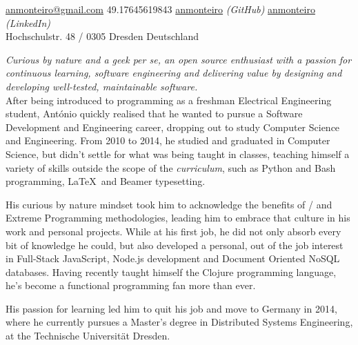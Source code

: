 \documentclass[10pt,a4paper]{article}
\begin{document}
\sloppy  %



\nobreakvspace{0.3em}  %

\noindent\href{mailto:anmonteiro.at.gmail.dot.com}{anmonteiro\mbox{}@\mbox{}gmail.com}\sbull
\textsmaller{+}49.17645619843\sbull
{\newnums \href{http://www.github.com/anmonteiro}{anmonteiro}} \emph{(GitHub)}\sbull
\href{http://www.linkedin.com/in/anmonteiro}{anmonteiro} \emph{(LinkedIn)}
\\
Hochschulstr. 48 / 0305 Dresden\sbull
Deutschland

\spacedhrule{0.9em}{-0.4em}  %


\vspace{-1.3em}  %
\begin{multicols}{2}  %
\emph{Curious by nature and a geek \emph{per se}, an open source enthusiast with a passion for continuous learning, software engineering and delivering value by designing and developing well-tested, maintainable software.}\\

After being introduced to programming as a freshman Electrical Engineering student, António quickly realised that he wanted to pursue a Software Development and Engineering career, dropping out to study Computer Science and Engineering. From 2010 to 2014, he studied and graduated in Computer Science, but didn't settle for what was being taught in classes, teaching himself a variety of skills outside the scope of the \emph{curriculum}, such as Python and Bash programming, \LaTeX\ and Beamer typesetting.

His curious by nature mindset took him to acknowledge the benefits of / and Extreme Programming methodologies, leading him to embrace that culture in his work and personal projects. While at his first job, he did not only absorb every bit of knowledge he could, but also developed a personal, out of the job interest in Full-Stack JavaScript, Node.js development and Document Oriented NoSQL databases. Having recently taught himself the Clojure programming language, he's become a functional programming fan more than ever.

His passion for learning led him to quit his job and move to Germany in 2014, where he currently pursues a Master's degree in Distributed Systems Engineering, at the Technische Universität Dresden.
\end{multicols}
\end{document}
